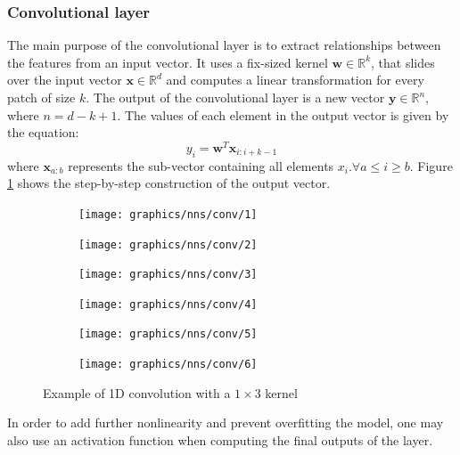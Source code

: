 	\subsubsection*{Convolutional layer}
	The main purpose of the convolutional layer is to extract relationships between the features from an input vector. It uses a fix-sized kernel $\mathbf{w} \in \mathbb{R}^k$, that slides over the input vector $\mathbf{x}\in\mathbb{R}^d$ and computes a linear transformation for every patch of size $k$. The output of the convolutional layer is a new vector $\mathbf{y}\in\mathbb{R}^n$, where $n=d - k + 1$. The values of each element in the output vector is given by the equation:
	\begin{equation}
		y_i = \mathbf{w}^T\mathbf{x}_{i:i+k-1}
	\end{equation}
	where $\mathbf{x}_{a:b}$ represents the sub-vector containing all elements $x_i. \forall a\leq i \geq b$. Figure \ref{Fig: prep/ml/cnn/convoLayer} shows the step-by-step construction of the output vector.
	\begin{figure}[H]
		\centering
		\begin{subfigure}[b]{0.3\linewidth}
			\texttt{[image: graphics/nns/conv/1]}
			\vspace*{1cm}
		\end{subfigure}
		\begin{subfigure}[b]{0.3\linewidth}
			\texttt{[image: graphics/nns/conv/2]}
			\vspace*{1cm}
		\end{subfigure}
		\begin{subfigure}[b]{0.3\linewidth}
			\texttt{[image: graphics/nns/conv/3]}
			\vspace*{1cm}
		\end{subfigure}
		\begin{subfigure}[b]{0.3\linewidth}
			\texttt{[image: graphics/nns/conv/4]}
		\end{subfigure}
		\begin{subfigure}[b]{0.3\linewidth}
			\texttt{[image: graphics/nns/conv/5]}
		\end{subfigure}
		\begin{subfigure}[b]{0.3\linewidth}
			\texttt{[image: graphics/nns/conv/6]}
		\end{subfigure}
		\caption[1D Convolution]{Example of 1D convolution with a $1\times3$ kernel}
		\label{Fig: prep/ml/cnn/convoLayer}
	\end{figure}
	In order to add further nonlinearity and prevent overfitting the model, one may also use an activation function when computing the final outputs of the layer. 

